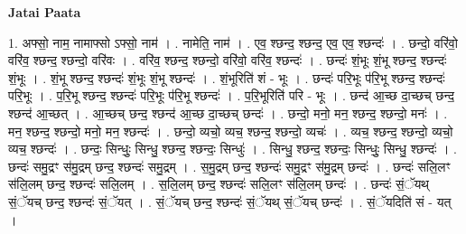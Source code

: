 \documentclass[17pt]{extarticle}
\begin{document}
\textbf{Jatai Paata} \newline

1. अफ्सो॒ नाम॒ नामाफ्सो ऽफ्सो॒ नाम॑ । . नामेति॒ नाम॑ । . एव॒ श्छन्द॒ श्छन्द॒ एव॒ एव॒ श्छन्दः॑ । . छन्दो॒ वरि॑वो॒ वरि॑व॒ श्छन्द॒ श्छन्दो॒ वरि॑वः । . वरि॑व॒ श्छन्द॒ श्छन्दो॒ वरि॑वो॒ वरि॑व॒ श्छन्दः॑ । . छन्दः॑ शं॒भूः शं॒भू श्छन्द॒ श्छन्दः॑ शं॒भूः । . शं॒भू श्छन्द॒ श्छन्दः॑ शं॒भूः शं॒भू श्छन्दः॑ । . शं॒भूरिति॑ शं - भूः । . छन्दः॑ परि॒भूः प॑रि॒भू श्छन्द॒ श्छन्दः॑ परि॒भूः । . प॒रि॒भू श्छन्द॒ श्छन्दः॑ परि॒भूः प॑रि॒भू श्छन्दः॑ । . प॒रि॒भूरिति॑ परि - भूः । . छन्द॑ आ॒च्छ दा॒च्छच् छन्द॒ श्छन्द॑ आ॒च्छत् । . आ॒च्छच् छन्द॒ श्छन्द॑ आ॒च्छ दा॒च्छच् छन्दः॑ । . छन्दो॒ मनो॒ मन॒ श्छन्द॒ श्छन्दो॒ मनः॑ । . मन॒ श्छन्द॒ श्छन्दो॒ मनो॒ मन॒ श्छन्दः॑ । . छन्दो॒ व्यचो॒ व्यच॒ श्छन्द॒ श्छन्दो॒ व्यचः॑ । . व्यच॒ श्छन्द॒ श्छन्दो॒ व्यचो॒ व्यच॒ श्छन्दः॑ । . छन्दः॒ सिन्धुः॒ सिन्धु॒ श्छन्द॒ श्छन्दः॒ सिन्धुः॑ । . सिन्धु॒ श्छन्द॒ श्छन्दः॒ सिन्धुः॒ सिन्धु॒ श्छन्दः॑ । . छन्दः॑ समु॒द्रꣳ स॑मु॒द्रम् छन्द॒ श्छन्दः॑ समु॒द्रम् । . स॒मु॒द्रम् छन्द॒ श्छन्दः॑ समु॒द्रꣳ स॑मु॒द्रम् छन्दः॑ । . छन्दः॑ सलि॒लꣳ स॑लि॒लम् छन्द॒ श्छन्दः॑ सलि॒लम् । . स॒लि॒लम् छन्द॒ श्छन्दः॑ सलि॒लꣳ स॑लि॒लम् छन्दः॑ । . छन्दः॑ सं॒ॅयथ् सं॒ॅयच् छन्द॒ श्छन्दः॑ सं॒ॅयत् । . सं॒ॅयच् छन्द॒ श्छन्दः॑ सं॒ॅयथ् सं॒ॅयच् छन्दः॑ । . सं॒ॅयदिति॑ सं - यत् । \newline
\end{document}
